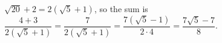 $\sqrt{20}+2=2\left(\sqrt5+1\right)$, so the sum is $\dfrac{4+3}{2\left(\sqrt5+1\right)}=\dfrac{7}{2\left(\sqrt5+1\right)}=\dfrac{7\left(\sqrt5-1\right)}{2\cdot4}=\boxed{\dfrac{7\sqrt5-7}{8}}$.
